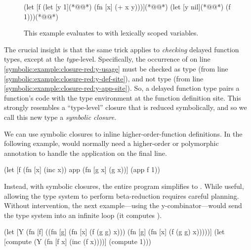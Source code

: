 \begin{figure}
{
\lstset{numbers=left}
\begin{cljlisting}
(let [f (let [y 1](*@\label{symbolic:example:closure-red:y-def-site}@*)
          (fn [x] (+ x y)))](*@\label{symbolic:example:closure-red:y-usage}@*)
  (let [y nil](*@\label{symbolic:example:closure-red:y-app-site}@*)
    (f 1)))(*@\label{symbolic:example:closure-red:f-app}@*)
\end{cljlisting}
}
  \caption{This example evaluates to  with lexically scoped variables.}
  \label{symbolic:example:closure-red}
\end{figure}

The crucial insight is that
the same trick applies to \emph{checking} delayed function types,
except at the \emph{type}-level.
Specifically, the occurrence of 
on line \ref{symbolic:example:closure-red:y-usage}
must be checked as type  (from line \ref{symbolic:example:closure-red:y-def-site}),
and not type  (from line \ref{symbolic:example:closure-red:y-app-site}).
So, a delayed function type pairs a function's code with the type environment
at the function definition site.
This strongly resembles a ``type-level'' closure that is reduced symbolically,
and so we call this new type a \emph{symbolic closure}.

We can use symbolic closures to inline higher-order-function definitions.
In the following example,  would normally need a higher-order
or polymorphic
annotation to handle the application on the final line.

\begin{cljlisting}
(let [f (fn [x] (inc x))
      app (fn [g x] (g x))]
  (app f 1))
\end{cljlisting}

Instead, with symbolic closures, the entire program simplifies to
.
While useful, allowing the type system to perform beta-reduction
requires careful planning.
Without intervention,
the next example---using the y-combinator---would send the type system into an
infinite loop (it computes ).

\begin{cljlisting}
(let [Y (fn [f]
          ((fn [g] (fn [x] (f (g g) x)))
           (fn [g] (fn [x] (f (g g) x)))))]
  (let [compute (Y (fn [f x] (inc (f x))))]
    (compute 1)))
\end{cljlisting}

